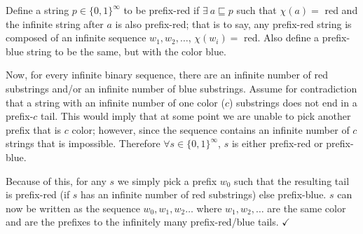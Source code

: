 \documentclass[11pt]{article}
\begin{document}
Define a string $p \in \{0,1\}^{\infty}$ to be prefix-red if $\exists \ a \sqsubseteq p $ such that $\chi(a) =$ red and the infinite string after $a$ is also prefix-red; that is to say, any prefix-red string is composed of an infinite sequence $w_1, w_2, \dots$, $\chi(w_i) =$ red. Also define a prefix-blue string to be the same, but with the color blue.

Now, for every infinite binary sequence, there are an infinite number of red substrings and/or an infinite number of blue substrings. Assume for contradiction that a string with an infinite number of one color ($c$) substrings does not end in a prefix-$c$ tail. This would imply that at some point we are unable to pick another prefix that is $c$ color; however, since the sequence contains an infinite number of $c$ strings that is impossible. Therefore $\forall s \in \{0,1\}^{\infty}$, $s$ is either prefix-red or prefix-blue.

Because of this, for any $s$ we simply pick a prefix $w_0$ such that the resulting tail is prefix-red (if $s$ has an infinite number of red substrings) else prefix-blue. $s$ can now be written as the sequence $w_0, w_1, w_2  \dots $ where $w_1, w_2, \dots$ are the same color and are the prefixes to the infinitely many prefix-red/blue tails. $\checkmark$
\end{document}
